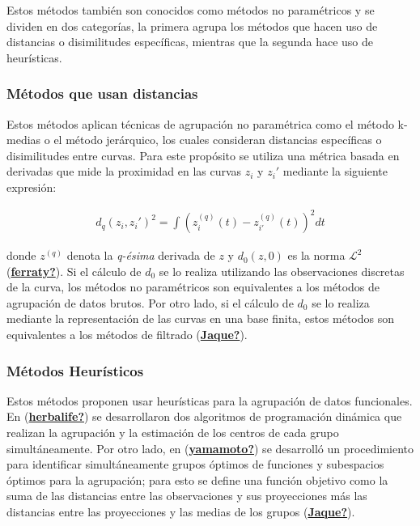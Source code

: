 \documentclass[
]{book}
\begin{document}
Estos métodos también son conocidos como métodos no paramétricos y se dividen en dos categorías, la primera agrupa los métodos que hacen uso de distancias o disimilitudes específicas, mientras que la segunda hace uso de heurísticas.

\hypertarget{muxe9todos-que-usan-distancias}{%
\subsubsection*{Métodos que usan distancias}\label{muxe9todos-que-usan-distancias}}

Estos métodos aplican técnicas de agrupación no paramétrica como el método k-medias o el método jerárquico, los cuales consideran distancias específicas o disimilitudes entre curvas. Para este propósito se utiliza una métrica basada en derivadas que mide la proximidad en las curvas \(z_i\) y \(z_i'\) mediante la siguiente expresión:

\begin{align*}
    d_q(z_i,z_i')^2=\int\left( z_i^{(q)}(t)-z_{i'}^{(q)}(t)\right)^2dt
\end{align*}

donde \(z^{(q)}\) denota la \emph{q-ésima} derivada de \(z\) y \(d_0(z,0)\) es la norma \(\mathcal{L}^2\) (\protect\hyperlink{ref-ferraty}{\textbf{ferraty?}}). Si el cálculo de \(d_0\) se lo realiza utilizando las observaciones discretas de la curva, los métodos no paramétricos son equivalentes a los métodos de agrupación de datos brutos. Por otro lado, si el cálculo de \(d_0\) se lo realiza mediante la representación de las curvas en una base finita, estos métodos son equivalentes a los métodos de filtrado (\protect\hyperlink{ref-Jaque}{\textbf{Jaque?}}).

\hypertarget{muxe9todos-heuruxedsticos}{%
\subsubsection*{Métodos Heurísticos}\label{muxe9todos-heuruxedsticos}}

Estos métodos proponen usar heurísticas para la agrupación de datos funcionales. En (\protect\hyperlink{ref-herbalife}{\textbf{herbalife?}}) se desarrollaron dos algoritmos de programación dinámica que realizan la agrupación y la estimación de los centros de cada grupo simultáneamente. Por otro lado, en (\protect\hyperlink{ref-yamamoto}{\textbf{yamamoto?}}) se desarrolló un procedimiento para identificar simultáneamente grupos óptimos de funciones y subespacios óptimos para la agrupación; para esto se define una función objetivo como la suma de las distancias entre las observaciones y sus proyecciones más las distancias entre las proyecciones y las medias de los grupos (\protect\hyperlink{ref-Jaque}{\textbf{Jaque?}}).
\end{document}
